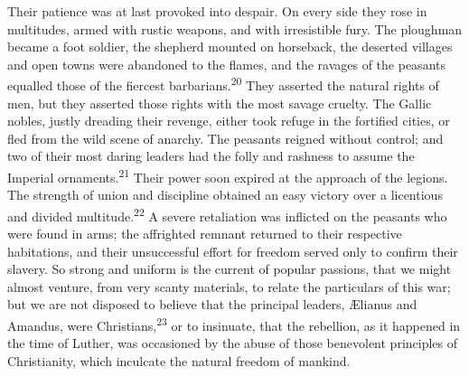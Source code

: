 Their patience was at last provoked into despair. On every side
they rose in multitudes, armed with rustic weapons, and with
irresistible fury. The ploughman became a foot soldier, the
shepherd mounted on horseback, the deserted villages and open
towns were abandoned to the flames, and the ravages of the
peasants equalled those of the fiercest barbarians.\textsuperscript{20} They
asserted the natural rights of men, but they asserted those
rights with the most savage cruelty. The Gallic nobles, justly
dreading their revenge, either took refuge in the fortified
cities, or fled from the wild scene of anarchy. The peasants
reigned without control; and two of their most daring leaders had
the folly and rashness to assume the Imperial ornaments.\textsuperscript{21} Their
power soon expired at the approach of the legions. The strength
of union and discipline obtained an easy victory over a
licentious and divided multitude.\textsuperscript{22} A severe retaliation was
inflicted on the peasants who were found in arms; the affrighted
remnant returned to their respective habitations, and their
unsuccessful effort for freedom served only to confirm their
slavery. So strong and uniform is the current of popular
passions, that we might almost venture, from very scanty
materials, to relate the particulars of this war; but we are not
disposed to believe that the principal leaders, Ælianus and
Amandus, were Christians,\textsuperscript{23} or to insinuate, that the rebellion,
as it happened in the time of Luther, was occasioned by the abuse
of those benevolent principles of Christianity, which inculcate
the natural freedom of mankind.






